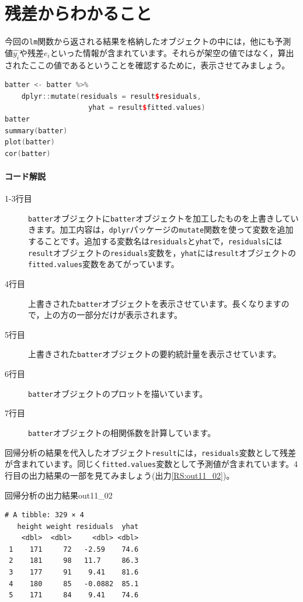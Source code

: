 \documentclass{ltjbook}
\begin{document}
\section{残差からわかること}
今回の\texttt{lm}関数から返される結果を格納したオブジェクトの中には，他にも予測値$\hat{y_i}$や残差$e_i$といった情報が含まれています。それらが架空の値ではなく，算出されたここの値であるということを確認するために，表示させてみましょう。

\begin{lstlisting}[language=c++,label={code:11_05},caption={回帰分析のその他の情報}]
batter <- batter %>% 
    dplyr::mutate(residuals = result$residuals,
                    yhat = result$fitted.values) 
batter
summary(batter)
plot(batter)
cor(batter)
\end{lstlisting}

\paragraph{コード解説}
\begin{description}
	\item[1-3行目] \verb|batter|オブジェクトに\verb|batter|オブジェクトを加工したものを上書きしていきます。加工内容は，\verb|dplyr|パッケージの\verb|mutate|関数を使って変数を追加することです。追加する変数名は\verb|residuals|と\verb|yhat|で，\verb|residuals|には\verb|result|オブジェクトの\verb|residuals|変数を，\verb|yhat|には\verb|result|オブジェクトの\verb|fitted.values|変数をあてがっています。
	\item[4行目] 上書きされた\verb|batter|オブジェクトを表示させています。長くなりますので，上の方の一部分だけが表示されます。
	\item[5行目] 上書きされた\verb|batter|オブジェクトの要約統計量を表示させています。
	\item[6行目] \verb|batter|オブジェクトのプロットを描いています。
	\item[7行目] \verb|batter|オブジェクトの相関係数を計算しています。
\end{description}

回帰分析の結果を代入したオブジェクト\verb|result|には，\verb|residuals|変数として残差が含まれています。同じく\verb|fitted.values|変数として予測値が含まれています。4行目の出力結果の一部を見てみましょう(出力\ref{RS:out11_02})。
\begin{Rscreen}{回帰分析の出力結果}{out11_02}
	\begin{verbatim}
# A tibble: 329 × 4
   height weight residuals  yhat
    <dbl>  <dbl>     <dbl> <dbl>
 1    171     72   -2.59    74.6
 2    181     98   11.7     86.3
 3    177     91    9.41    81.6
 4    180     85   -0.0882  85.1
 5    171     84    9.41    74.6
\end{verbatim}
\end{Rscreen}
\end{document}
